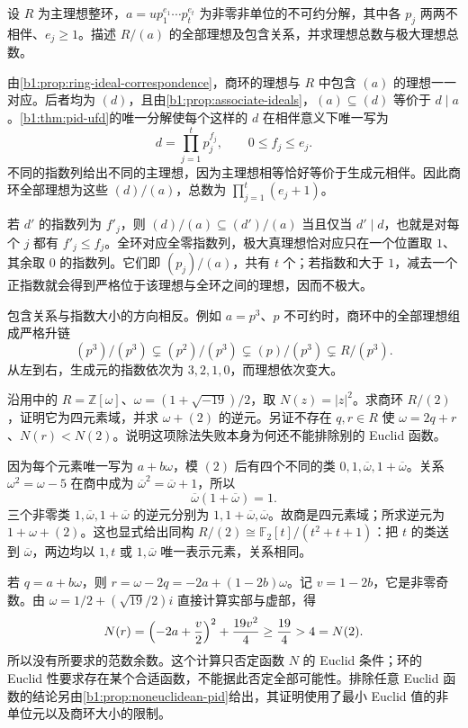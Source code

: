 \begin{exercise}\label{b1:ex:11-pid-quotient-ideals}
	设 \(R\) 为主理想整环，\(a=u p_1^{e_1}\cdots p_t^{e_t}\) 为非零非单位的不可约分解，其中各 \(p_j\) 两两不相伴、\(e_j\geq1\)。描述 \(R/(a)\) 的全部理想及包含关系，并求理想总数与极大理想总数。
\end{exercise}
\begin{solution}
	由\cref{b1:prop:ring-ideal-correspondence}，商环的理想与 \(R\) 中包含 \((a)\) 的理想一一对应。后者均为 \((d)\)，且由\cref{b1:prop:associate-ideals}，\((a)\subseteq(d)\) 等价于 \(d\mid a\)。\cref{b1:thm:pid-ufd}的唯一分解使每个这样的 \(d\) 在相伴意义下唯一写为
	\[
		d=\prod_{j=1}^t p_j^{f_j},\qquad 0\leq f_j\leq e_j.
	\]
	不同的指数列给出不同的主理想，因为主理想相等恰好等价于生成元相伴。因此商环全部理想为这些 \((d)/(a)\)，总数为 \(\prod_{j=1}^t(e_j+1)\)。

	若 \(d'\) 的指数列为 \(f'_j\)，则 \((d)/(a)\subseteq(d')/(a)\) 当且仅当 \(d'\mid d\)，也就是对每个 \(j\) 都有 \(f'_j\leq f_j\)。全环对应全零指数列，极大真理想恰对应只在一个位置取 \(1\)、其余取 \(0\) 的指数列。它们即 \((p_j)/(a)\)，共有 \(t\) 个；若指数和大于 \(1\)，减去一个正指数就会得到严格位于该理想与全环之间的理想，因而不极大。

	包含关系与指数大小的方向相反。例如 \(a=p^3\)、\(p\) 不可约时，商环中的全部理想组成严格升链
	\[
		(p^3)/(p^3)\subsetneq(p^2)/(p^3) \subsetneq(p)/(p^3)\subsetneq R/(p^3).
	\]
	从左到右，生成元的指数依次为 \(3,2,1,0\)，而理想依次变大。
\end{solution}

\begin{optionalexercise}\label{b1:ex:11-nineteen-quotient}
	沿用中的 \(R=\mathbb Z[\omega]\)、\(\omega=(1+\sqrt{-19})/2\)，取 \(N(z)=\lvert z\rvert^2\)。求商环 \(R/(2)\)，证明它为四元素域，并求 \(\omega+(2)\) 的逆元。另证不存在 \(q,r\in R\) 使 \(\omega=2q+r\)、\(N(r)<N(2)\)。说明这项除法失败本身为何还不能排除别的 Euclid 函数。
\end{optionalexercise}
\begin{solution}
	因为每个元素唯一写为 \(a+b\omega\)，模 \((2)\) 后有四个不同的类 \(0,1,\overline\omega,1+\overline\omega\)。关系 \(\omega^2=\omega-5\) 在商中成为 \(\overline\omega^2=\overline\omega+1\)，所以
	\[
		\overline\omega(1+\overline\omega)=1.
	\]
	三个非零类 \(1,\overline\omega,1+\overline\omega\) 的逆元分别为 \(1,1+\overline\omega,\overline\omega\)。故商是四元素域；所求逆元为 \(1+\omega+(2)\)。这也显式给出同构 \(R/(2)\cong\mathbb F_2[t]/(t^2+t+1)\)：把 \(t\) 的类送到 \(\overline\omega\)，两边均以 \(1,t\) 或 \(1,\overline\omega\) 唯一表示元素，关系相同。

	若 \(q=a+b\omega\)，则 \(r=\omega-2q=-2a+(1-2b)\omega\)。记 \(v=1-2b\)，它是非零奇数。由 \(\omega=1/2+(\sqrt{19}/2)i\) 直接计算实部与虚部，得
	\[
		N(r)=\Bigl(-2a+\frac v2\Bigr)^2+\frac{19v^2}{4} \geq\frac{19}{4}>4=N(2).
	\]
	所以没有所要求的范数余数。这个计算只否定函数 \(N\) 的 Euclid 条件；环的 Euclid 性要求存在某个合适函数，不能据此否定全部可能性。排除任意 Euclid 函数的结论另由\cref{b1:prop:noneuclidean-pid}给出，其证明使用了最小 Euclid 值的非单位元以及商环大小的限制。
\end{solution}

